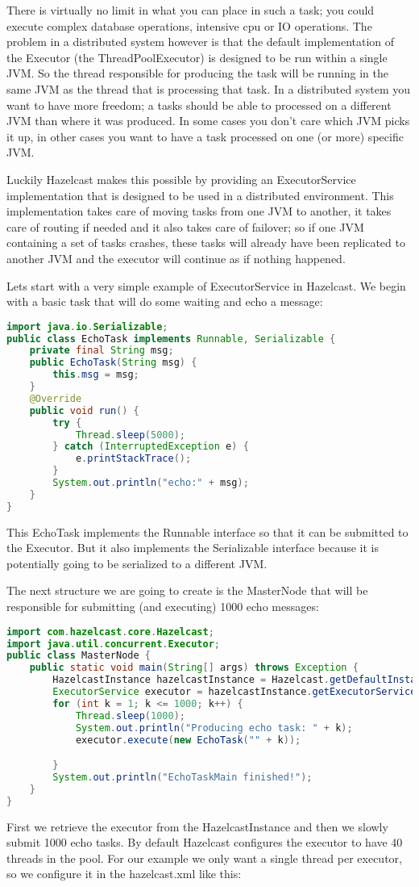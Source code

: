 There is virtually no limit in what you can place in such a task; you could execute complex database operations, intensive cpu or IO operations. The problem in a distributed system however is that the default implementation of the Executor (the ThreadPoolExecutor) is designed to be run within a single JVM. So the thread responsible for producing the task will be running in the same JVM as the thread that is processing that task. In a distributed system you want to have more freedom; a tasks should be able to processed on a different JVM than where it was produced. In some cases you don't care which JVM picks it up, in other cases you want to have a task processed on one (or more) specific JVM.

Luckily Hazelcast makes this possible by providing an ExecutorService implementation that is designed to be used in a distributed environment. This implementation takes care of moving tasks from one JVM to another, it takes care of routing if needed and it also takes care of failover; so if one JVM containing a set of tasks crashes, these tasks will already have been replicated to another JVM and the executor will continue as if nothing happened.

Lets start with a very simple example of ExecutorService in Hazelcast. We begin with a basic task that will do some waiting and echo a message:
\begin{lstlisting}[language=java]
import java.io.Serializable;
public class EchoTask implements Runnable, Serializable {
    private final String msg;
    public EchoTask(String msg) {
        this.msg = msg;
    }
    @Override
    public void run() {
        try {
            Thread.sleep(5000);
        } catch (InterruptedException e) {
            e.printStackTrace();
        }
        System.out.println("echo:" + msg);
    }
}
\end{lstlisting}
This EchoTask implements the Runnable interface so that it can be submitted to the Executor. But it also implements the Serializable interface because it is potentially going to be serialized to a different JVM. 

The next structure we are going to create is the MasterNode that will be responsible for submitting (and executing) 1000 echo messages:
\begin{lstlisting}[language=java]
import com.hazelcast.core.Hazelcast;
import java.util.concurrent.Executor;
public class MasterNode {
    public static void main(String[] args) throws Exception {
        HazelcastInstance hazelcastInstance = Hazelcast.getDefaultInstance();
        ExecutorService executor = hazelcastInstance.getExecutorService("executor");
        for (int k = 1; k <= 1000; k++) {
            Thread.sleep(1000);
            System.out.println("Producing echo task: " + k);
            executor.execute(new EchoTask("" + k));

        }
        System.out.println("EchoTaskMain finished!");
    }
}
\end{lstlisting}
First we retrieve the executor from the HazelcastInstance and then we slowly submit 1000 echo tasks. By default Hazelcast configures the executor to have 40 threads in the pool. For our example we only want a single thread per executor, so we configure it in the hazelcast.xml like this:

